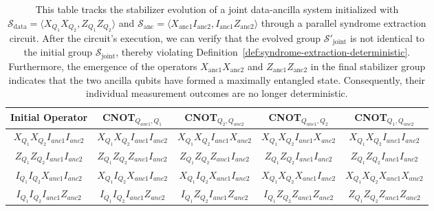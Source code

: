 \documentclass[acmsmall,screen,review,anonymous,nonacm]{acmart}
\begin{document}
\begin{table}[h]
    \centering
    \renewcommand{\arraystretch}{1.5}
    \begin{tabular}{|c|c|c|c|c|}
        \hline
        \textbf{Initial Operator} & \textbf{CNOT$_{Q_{anc1}, Q_1}$} & \textbf{CNOT$_{Q_2, Q_{anc2}}$} & \textbf{CNOT$_{Q_{anc1}, Q_2}$} & \textbf{CNOT$_{Q_1, Q_{anc2}}$} \\
        \hline
        $X_{Q_1} X_{Q_2} I_{anc1} I_{anc2}$ & $X_{Q_1} X_{Q_2} I_{anc1} I_{anc2}$ & $X_{Q_1} X_{Q_2} I_{anc1} X_{anc2}$ & $X_{Q_1} X_{Q_2} I_{anc1} X_{anc2}$ & \textbf{$X_{Q_1} X_{Q_2} I_{anc1} I_{anc2}$} \\
        \hline
        $Z_{Q_1} Z_{Q_2} I_{anc1} I_{anc2}$ & $Z_{Q_1} Z_{Q_2} Z_{anc1} I_{anc2}$ & $Z_{Q_1} Z_{Q_2} Z_{anc1} I_{anc2}$ & $Z_{Q_1} Z_{Q_2} I_{anc1} I_{anc2}$ & \textbf{$Z_{Q_1} Z_{Q_2} I_{anc1} I_{anc2}$} \\
        \hline
        $I_{Q_1} I_{Q_2} X_{anc1} I_{anc2}$ & $X_{Q_1} I_{Q_2} X_{anc1} I_{anc2}$ & $X_{Q_1} I_{Q_2} X_{anc1} I_{anc2}$ & $X_{Q_1} X_{Q_2} X_{anc1} I_{anc2}$ & \textbf{$X_{Q_1} X_{Q_2} X_{anc1} X_{anc2}$} \\
        \hline
        $I_{Q_1} I_{Q_2} I_{anc1} Z_{anc2}$ & $I_{Q_1} I_{Q_2} I_{anc1} Z_{anc2}$ & $I_{Q_1} Z_{Q_2} I_{anc1} Z_{anc2}$ & $I_{Q_1} Z_{Q_2} Z_{anc1} Z_{anc2}$ & \textbf{$Z_{Q_1} Z_{Q_2} Z_{anc1} Z_{anc2}$} \\
        \hline
    \end{tabular}
    \caption{This table tracks the stabilizer evolution of a joint data-ancilla system initialized with $\mathcal{S}_{\mathrm{data}}=\langle X_{Q_1}X_{Q_2}, Z_{Q_1}Z_{Q_2}\rangle$ and $\mathcal{S}_{\mathrm{anc}}=\langle X_{\mathrm{anc1}}I_{\mathrm{anc2}}, I_{\mathrm{anc1}}Z_{\mathrm{anc2}}\rangle$ through a parallel syndrome extraction circuit. After the circuit's execution, we can verify that the evolved group $\mathcal{S}'_{\mathrm{joint}}$ is not identical to the initial group $\mathcal{S}_{\mathrm{joint}}$, thereby violating Definition~\ref{def:syndrome-extraction-deterministic}. Furthermore, the emergence of the operators $X_{\mathrm{anc1}}X_{\mathrm{anc2}}$ and $Z_{\mathrm{anc1}}Z_{\mathrm{anc2}}$ in the final stabilizer group indicates that the two ancilla qubits have formed a maximally entangled state. Consequently, their individual measurement outcomes are no longer deterministic.}
    \label{tab:stabilizer-evolution}
\end{table}
\end{document}
